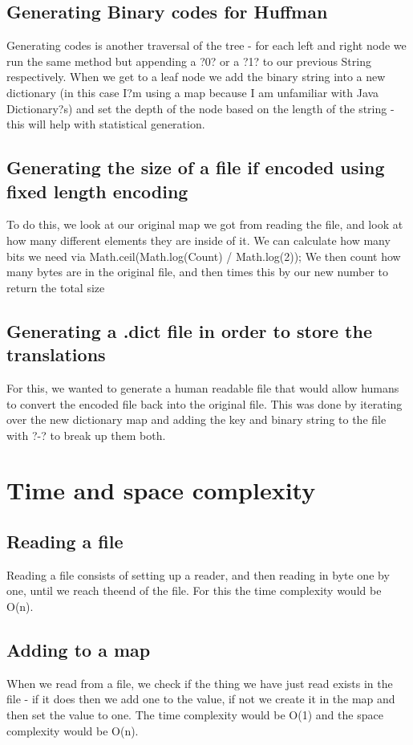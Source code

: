 \documentclass[11pt, oneside]{amsart}
\begin{document}
	\subsection{Generating Binary codes for Huffman}
		Generating codes is another traversal of the tree - for each left and right node we run the same method but appending a ?0? or a ?1? to our previous String respectively. When we get to a leaf node we add the binary string into a new dictionary (in this case I?m using a map because I am unfamiliar with Java Dictionary?s) and set the depth of the node based on the length of the string - this will help with statistical generation.
	\subsection{Generating the size of a file if encoded using fixed length encoding}
		To do this, we look at our original map we got from reading the file, and look at how many different elements they are inside of it. We can calculate how many bits we need via Math.ceil(Math.log(Count) / Math.log(2)); We then count how many bytes are in the original file, and then times this by our new number to return the total size
	\subsection{Generating a .dict file in order to store the translations}
		For this, we wanted to generate a human readable file that would allow humans to convert the encoded file back into the original file. This was done by iterating over the new dictionary map and adding the key and binary string to the file with ?-? to break up them both.
\section{Time and space complexity}
	\subsection{Reading a file}
		Reading a file consists of setting up a reader, and then reading in byte one by one, until we reach theend of the file. For this the time complexity would be O(n).
	\subsection{Adding to a map}
		When we read from a file, we check if the thing we have just read exists in the file - if it does then we add one to the value, if not we create it in the map and then set the value to one. The time complexity would be O(1) and the space complexity would be O(n).
\end{document}
